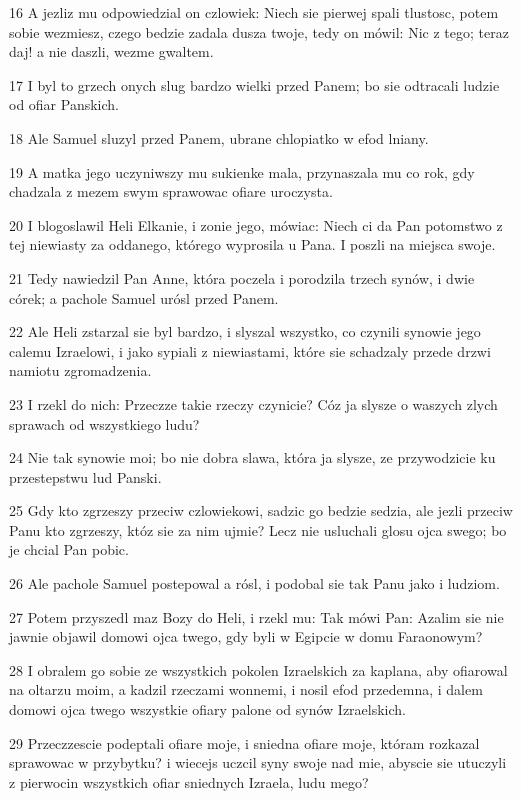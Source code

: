 \par 16 A jezliz mu odpowiedzial on czlowiek: Niech sie pierwej spali tlustosc, potem sobie wezmiesz, czego bedzie zadala dusza twoje, tedy on mówil: Nic z tego; teraz daj! a nie daszli, wezme gwaltem.
\par 17 I byl to grzech onych slug bardzo wielki przed Panem; bo sie odtracali ludzie od ofiar Panskich.
\par 18 Ale Samuel sluzyl przed Panem, ubrane chlopiatko w efod lniany.
\par 19 A matka jego uczyniwszy mu sukienke mala, przynaszala mu co rok, gdy chadzala z mezem swym sprawowac ofiare uroczysta.
\par 20 I blogoslawil Heli Elkanie, i zonie jego, mówiac: Niech ci da Pan potomstwo z tej niewiasty za oddanego, którego wyprosila u Pana. I poszli na miejsca swoje.
\par 21 Tedy nawiedzil Pan Anne, która poczela i porodzila trzech synów, i dwie córek; a pachole Samuel urósl przed Panem.
\par 22 Ale Heli zstarzal sie byl bardzo, i slyszal wszystko, co czynili synowie jego calemu Izraelowi, i jako sypiali z niewiastami, które sie schadzaly przede drzwi namiotu zgromadzenia.
\par 23 I rzekl do nich: Przeczze takie rzeczy czynicie? Cóz ja slysze o waszych zlych sprawach od wszystkiego ludu?
\par 24 Nie tak synowie moi; bo nie dobra slawa, która ja slysze, ze przywodzicie ku przestepstwu lud Panski.
\par 25 Gdy kto zgrzeszy przeciw czlowiekowi, sadzic go bedzie sedzia, ale jezli przeciw Panu kto zgrzeszy, któz sie za nim ujmie? Lecz nie usluchali glosu ojca swego; bo je chcial Pan pobic.
\par 26 Ale pachole Samuel postepowal a rósl, i podobal sie tak Panu jako i ludziom.
\par 27 Potem przyszedl maz Bozy do Heli, i rzekl mu: Tak mówi Pan: Azalim sie nie jawnie objawil domowi ojca twego, gdy byli w Egipcie w domu Faraonowym?
\par 28 I obralem go sobie ze wszystkich pokolen Izraelskich za kaplana, aby ofiarowal na oltarzu moim, a kadzil rzeczami wonnemi, i nosil efod przedemna, i dalem domowi ojca twego wszystkie ofiary palone od synów Izraelskich.
\par 29 Przeczzescie podeptali ofiare moje, i sniedna ofiare moje, któram rozkazal sprawowac w przybytku? i wiecejs uczcil syny swoje nad mie, abyscie sie utuczyli z pierwocin wszystkich ofiar sniednych Izraela, ludu mego?
